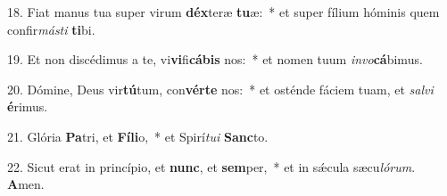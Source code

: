 18. Fiat manus tua super virum \textbf{déx}teræ \textbf{tu}æ:~*  et super fílium hóminis quem confir\textit{más}\textit{ti} \textbf{ti}bi.\

19. Et non discédimus a te, vi\textbf{vi}fi\textbf{cá}\textbf{bis} nos:~*  et nomen tuum \textit{in}\textit{vo}\textbf{cá}bimus.\

20. Dómine, Deus vir\textbf{tú}tum, con\textbf{vér}\textbf{te} nos:~*  et osténde fáciem tuam, et \textit{sal}\textit{vi} \textbf{é}rimus.\

21. Glória \textbf{Pa}tri, et \textbf{Fí}\textbf{li}o,~*  et Spirí\textit{tu}\textit{i} \textbf{Sanc}to.\

22. Sicut erat in princípio, et \textbf{nunc}, et \textbf{sem}per,~*  et in sǽcula sæcu\textit{ló}\textit{rum}. \textbf{A}men.\

